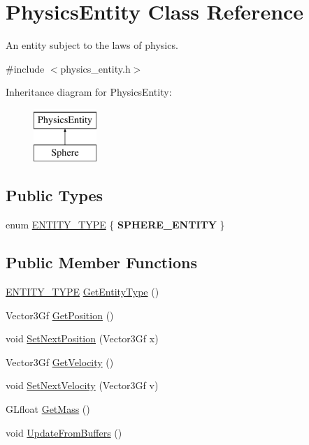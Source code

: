 \hypertarget{classPhysicsEntity}{}\section{Physics\+Entity Class Reference}
\label{classPhysicsEntity}


An entity subject to the laws of physics.  




{\ttfamily \#include $<$physics\+\_\+entity.\+h$>$}

Inheritance diagram for Physics\+Entity\+:\begin{figure}[H]
\begin{center}
\leavevmode
\includegraphics[height=2.000000cm]{classPhysicsEntity}
\end{center}
\end{figure}
\subsection*{Public Types}
\begin{DoxyCompactItemize}
\item 
enum \hyperlink{classPhysicsEntity_a171840d3fef1fc21c3f922b240e03538}{E\+N\+T\+I\+T\+Y\+\_\+\+T\+Y\+PE} \{ {\bfseries S\+P\+H\+E\+R\+E\+\_\+\+E\+N\+T\+I\+TY}
 \}
\end{DoxyCompactItemize}
\subsection*{Public Member Functions}
\begin{DoxyCompactItemize}
\item 
\hyperlink{classPhysicsEntity_a171840d3fef1fc21c3f922b240e03538}{E\+N\+T\+I\+T\+Y\+\_\+\+T\+Y\+PE} \hyperlink{classPhysicsEntity_a5a1eb68e1ecb2d845959addbbc915577}{Get\+Entity\+Type} ()
\item 
Vector3\+Gf \hyperlink{classPhysicsEntity_a73d263f4efb4fc87b36493f340d94a97}{Get\+Position} ()
\item 
void \hyperlink{classPhysicsEntity_a18913bb368bbe6e61e6838d7e8353bd4}{Set\+Next\+Position} (Vector3\+Gf x)
\item 
Vector3\+Gf \hyperlink{classPhysicsEntity_a2064523af6e64719996d505360e37af1}{Get\+Velocity} ()
\item 
void \hyperlink{classPhysicsEntity_a6d23d47421d535cc934405e8a7d1a43b}{Set\+Next\+Velocity} (Vector3\+Gf v)
\item 
G\+Lfloat \hyperlink{classPhysicsEntity_a07943c4b81878d402b97d1280f8c8ff9}{Get\+Mass} ()
\item 
void \hyperlink{classPhysicsEntity_a912c227d955b9a3c82e77b9732c8e5f2}{Update\+From\+Buffers} ()
\end{DoxyCompactItemize}

